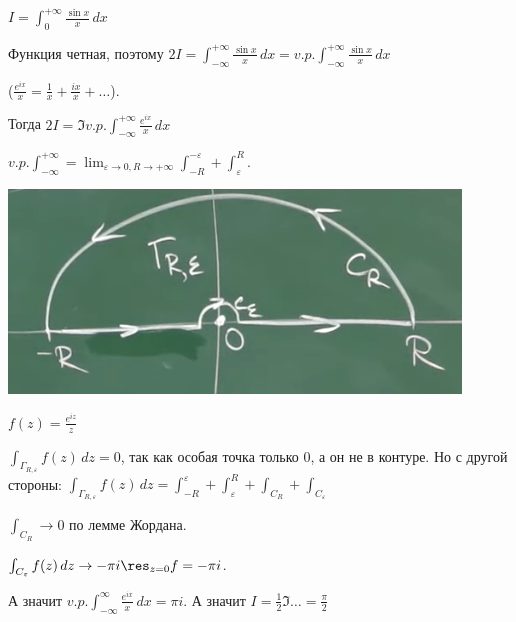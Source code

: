 \begin{example}
    $I = \int_{0}^{+\infty} \frac{\sin x}{x} \, dx$

    Функция четная, поэтому $2I = \int_{-\infty}^{+\infty} \frac{\sin x}{x} \, dx = v.p. \int_{-\infty}^{+\infty} \frac{\sin x}{x} \, dx$
    
    ($\frac{e^{ix}}{x} = \frac{1}{x} + \frac{ix}{x} + \ldots$).

    Тогда $2I = \Im v.p. \int_{-\infty}^{+\infty} \frac{e^{ix}}{x} \, dx$

    $v.p. \int_{-\infty}^{+\infty} = \lim_{\varepsilon \to 0, R \to +\infty} \int_{-R}^{-\varepsilon} + \int_{\varepsilon}^{R}$.

    \begin{center}
        \includegraphics[width=12cm]{assets/04-functions-of-complex-variables/example-principal-value-integral.png}
    \end{center}

    $f(z) = \frac{e^{iz}}{z}$

    $\int_{\Gamma_{R, \varepsilon}} f(z) \, dz = 0$, так как особая точка только 0, а он не в контуре.
    Но с другой стороны: $\int_{\Gamma_{R, \varepsilon}} f(z) \, dz = \int_{-R}^{\varepsilon} + \int_{\varepsilon}^{R} + \int_{C_R} + \int_{C_{\varepsilon}}$

    $\int_{C_R} \rightarrow 0$ по лемме Жордана.

    $\int_{C_{\varepsilon}} f(z) \, dz \rightarrow -\pi i \res_{z = 0} f = -\pi i$.

    А значит $v.p. \int_{-\infty}^{\infty} \frac{e^{ix}}{x} \, dx = \pi i$. А значит
    $I = \frac{1}{2} \Im \ldots = \frac{\pi}{2}$
\end{example}

\newpage

